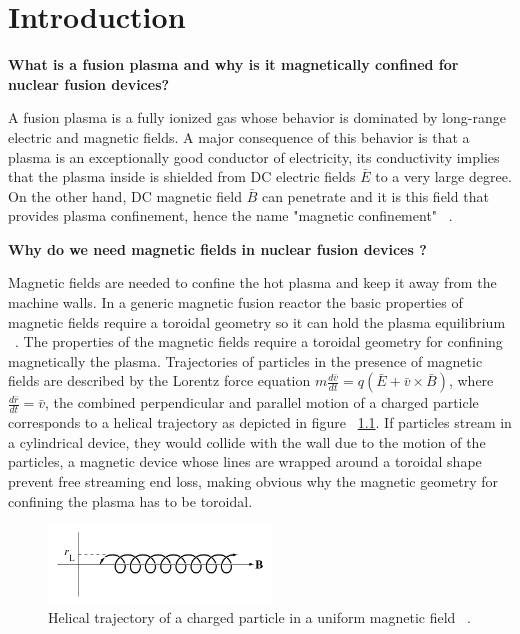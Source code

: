 \chapter{Introduction}

\textbf{What is a fusion plasma and why is it magnetically confined for nuclear fusion devices?}

A fusion plasma is a fully ionized gas whose behavior is dominated by long-range electric and magnetic fields. A major consequence of this behavior is that a plasma is an exceptionally good conductor of electricity, its conductivity implies that the plasma inside is shielded from DC electric fields $\bar{E}$ to a very large degree. On the other hand, DC magnetic field $\bar{B}$ can penetrate and it is this field that provides plasma confinement, hence the name "magnetic confinement" ~\cite[Chapter~6]{Freidberg2007}.\smallskip

\textbf{Why do we need magnetic fields in nuclear fusion devices ?}
\smallskip

Magnetic fields are needed to confine the hot plasma and keep it away from the machine walls.  In a generic magnetic fusion reactor the basic properties of magnetic fields require  a toroidal geometry so it can hold the plasma equilibrium ~\cite[Chapter~4]{Freidberg2007}. The properties of the magnetic fields require a toroidal geometry for confining magnetically the plasma. Trajectories of particles in the presence of magnetic fields are described by the Lorentz force equation $m \frac{d\bar{v}}{dt}=q(\bar{E}+\bar{v}\times \bar{B})$, where $\frac{d\bar{r}}{dt}=\bar{v}$, the combined perpendicular and parallel motion of a charged particle corresponds to a helical trajectory as  depicted in figure ~\ref{Helical}. If particles stream in a cylindrical device, they would collide with the wall due to the motion of the particles, a magnetic device whose lines are wrapped around  a toroidal shape  prevent free streaming end loss, making obvious why the magnetic geometry for confining the plasma has to be toroidal.\smallskip

\begin{figure}
	\centering
	\includegraphics[width=0.525\textwidth]{Chp1/Helical_tray.png}
	\caption{  Helical trajectory of a charged particle in a uniform magnetic field ~\cite[Chapter~8]{Freidberg2007}.\label{Helical}}
\end{figure}

